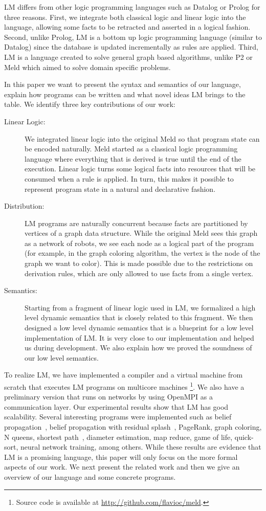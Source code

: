 LM differs from other logic programming languages such as Datalog or Prolog for three reasons. First, we integrate both classical
logic and linear logic into the language, allowing some facts to be retracted and asserted in a logical fashion. Second, unlike
Prolog, LM is a bottom up logic programming language (similar to Datalog) since the database is updated incrementally as rules are
applied. Third, LM is a language created to solve general graph based algorithms, unlike P2 or Meld which aimed to solve domain
specific problems.

In this paper we want to present the syntax and semantics of our language, explain how programs can be written
and what novel ideas LM brings to the table. We identify three key contributions of our work:

\begin{description}
   \item[Linear Logic:] We integrated linear logic into the original Meld so that program state can be encoded naturally.
   Meld started as a classical logic programming language where everything that is derived is true until the end
   of the execution. Linear logic turns some logical facts into resources that will be consumed when a rule is applied. In turn, this makes it possible to represent program state in a natural and declarative fashion.
   \item[Distribution:] LM programs are naturally concurrent because facts are partitioned by vertices of a graph data structure. While the original Meld sees this graph as a network of robots, we see each node as a logical part of the program (for example, in the graph coloring algorithm, the vertex is the node of the graph we want to color). This is made possible due to the restrictions on derivation rules, which are only allowed to use facts from a single vertex.
   \item[Semantics:] Starting from a fragment of linear logic used in LM, we formalized a high level dynamic semantics that is closely related to this fragment.
   We then designed a low level dynamic semantics that is a blueprint for a low level implementation of LM. It is very
   close to our implementation and helped us during development. We also explain how we proved the soundness of our low level semantics.
\end{description}

To realize LM, we have implemented a compiler and a virtual machine from scratch that executes LM programs on multicore machines
\footnote{Source code is available at \url{http://github.com/flavioc/meld}.}. We also have a preliminary version that runs on networks by
using OpenMPI as a communication layer. Our experimental results show that LM has good scalability.
Several interesting programs were implemented such as belief propagation~\cite{Gonzalez+al:aistats09paraml},
belief propagation with residual splash~\cite{Gonzalez+al:aistats09paraml}, PageRank, graph coloring,
N queens, shortest path~\cite{Dijkstra}, diameter estimation, map reduce, game of life, quick-sort, neural network training, among others.
While these results are evidence that LM is a promising language, this paper will only focus on the more formal aspects of our work.
We next present the related work and then we give an overview of our language and some concrete programs.

